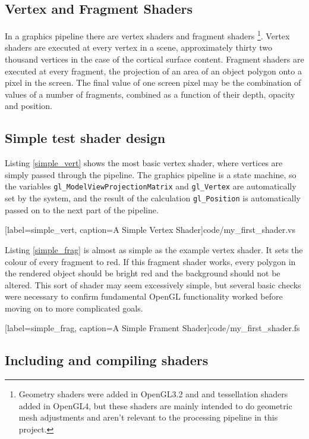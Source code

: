 \documentclass[MSc,paper=a4,pagesize=auto]{icldt}
\begin{document}
\subsection{Vertex and Fragment Shaders}
In a graphics pipeline there are vertex shaders and fragment shaders \footnote{Geometry shaders were added in OpenGL3.2 and and tessellation shaders added in OpenGL4, but these shaders are mainly intended to do geometric mesh adjustments and aren't relevant to the processing pipeline in this project.}. Vertex shaders are executed at every vertex in a scene, approximately thirty two thousand vertices in the case of the cortical surface content. Fragment shaders are executed at every fragment, the projection of an area of an object polygon onto a pixel in the screen. The final value of one screen pixel may be the combination of values of a number of fragments, combined as a function of their depth, opacity and position.

\subsection{Simple test shader design}
Listing \ref{simple_vert} shows the most basic vertex shader, where vertices are simply passed through the pipeline. The graphics pipeline is a state machine, so the variables \texttt{gl\_ModelViewProjectionMatrix} and \texttt{gl\_Vertex} are automatically set by the system, and the result of the calculation \texttt{gl\_Position} is automatically passed on to the next part of the pipeline.


  [label=simple_vert, caption=A Simple Vertex Shader]{code/my_first_shader.vs}

Listing \ref{simple_frag} is almost as simple as the example vertex shader. It sets the colour of every fragment to red. If this fragment shader works, every polygon in the rendered object should be bright red and the background should not be altered. This sort of shader may seem excessively simple, but several basic checks were necessary to confirm fundamental OpenGL functionality worked before moving on to more complicated goals.


  [label=simple_frag, caption=A Simple Frament Shader]{code/my_first_shader.fs}

\subsection{Including and compiling shaders}
\end{document}
